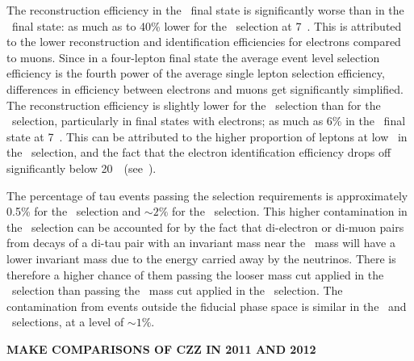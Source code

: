 The reconstruction efficiency in the \eeee\ final state is significantly worse
than in the \mmmm\ final state: as much as to 40\% lower for the \ZZs\ selection
at 7~\tev. This is attributed to the lower reconstruction and identification
efficiencies for electrons compared to muons. Since in a four-lepton final state
the average event level selection efficiency is the fourth power of the average
single lepton selection efficiency, differences in efficiency between electrons
and muons get significantly simplified. The reconstruction efficiency is 
slightly lower for the \ZZs\ selection than for the \ZZ\ selection, particularly
in final states with electrons; as much as
6\% in the \eeee\ final state at 7~\tev. This can be attributed to the higher
proportion of leptons at low \pt\ in the \ZZs\ selection, and the fact that the
electron identification efficiency drops off significantly below
20~\gev\ (see~).

The percentage of tau events passing the selection requirements is approximately
0.5\% for the \ZZ\ selection and $\sim2\%$ for the \ZZs\ selection. This higher
contamination in the \ZZs\ selection can be accounted for by the fact that
di-electron or di-muon pairs from decays of a di-tau pair with an invariant mass
near the \Z\ mass will have a lower invariant mass due to the energy carried
away by the neutrinos. There is therefore a higher chance of them passing the
looser mass cut applied in the \ZZs\ selection than passing the \sstooos\ mass
cut applied in the \ZZ\ selection. The contamination from events outside the
fiducial phase space is similar in the \ZZ\ and \ZZs\ selections, at a level of
$\sim1\%$.

{\bf MAKE COMPARISONS OF CZZ IN 2011 AND 2012}


